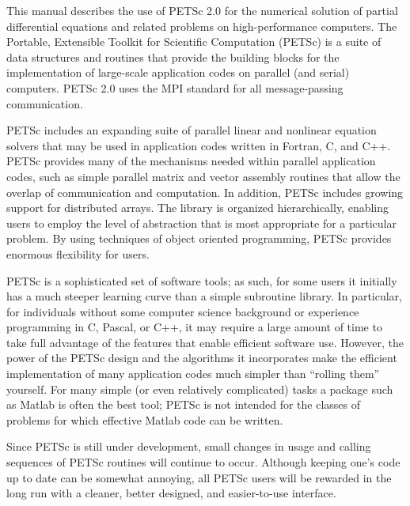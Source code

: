 

\medskip \medskip
This manual describes the use of PETSc 2.0 for the numerical solution
of partial differential equations and related problems 
on high-performance computers.  The
Portable, Extensible Toolkit for Scientific Computation (PETSc) is a
suite of data structures and routines that provide the building
blocks for the implementation of large-scale application codes on parallel
(and serial) computers.  PETSc 2.0 uses the MPI standard for all
message-passing communication.

PETSc includes an expanding suite of parallel linear and nonlinear
equation solvers that may be  used in application codes written in
Fortran, C, and C++.  PETSc provides many of the mechanisms needed
within parallel application codes, such as simple parallel matrix and
vector assembly routines that allow the overlap of communication and
computation.  In addition, PETSc includes growing support for
distributed arrays.  The library is organized
hierarchically, enabling users to employ the level of abstraction that
is most appropriate for a particular problem. By using techniques 
of object oriented programming, PETSc provides enormous flexibility 
for users.

PETSc is a sophisticated set of software tools; as such, for some
users it initially has a much steeper learning curve than a
simple subroutine library. In particular, for individuals without some
computer science background or experience programming in C,
Pascal, or C++, it may require a large amount of time to take full
advantage of the features that enable efficient software use.
However, the power of the PETSc design and
the algorithms it incorporates make the efficient implementation of
many application codes much simpler than ``rolling them'' yourself.
For many simple (or even relatively complicated) tasks a package such as
Matlab is often the best tool; PETSc is not intended for the classes
of problems for which effective Matlab code can be written.

Since PETSc is still under development, small changes in usage and
calling sequences of PETSc routines will continue to occur.  Although
keeping one's code up to date can be somewhat annoying,
all PETSc users will be rewarded in the long run with a cleaner,
better designed, and easier-to-use interface.
